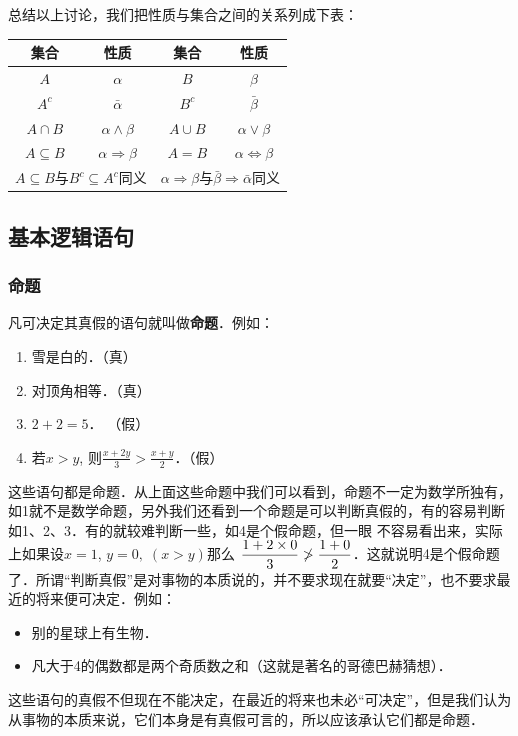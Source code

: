 总结以上讨论，我们把性质与集合之间的关系列成下表：
\begin{center}
	\begin{tabular}{cc|cc}
		\hline
		集合  & 性质 &集合  &性质\\
		\hline
		$A$ & $\alpha$ & $B$ & $\beta$\\
		$A^c$ & $\bar\alpha$ & $B^c$ & $\bar\beta$\\
		$A\cap B$ & $\alpha\wedge \beta$ & $A\cup B$ & $\alpha\vee\beta$\\
		$A\subseteq B$ & $\alpha\Rightarrow\beta $& $A=B$&$\alpha\Leftrightarrow \beta$\\
		\multicolumn{2}{c|}{$A\subseteq B$与$B^c\subseteq A^c$同义}& \multicolumn{2}{|c}{$\alpha\Rightarrow\beta$与$\bar\beta\Rightarrow\bar\alpha$同义}\\
		\hline
	\end{tabular}
\end{center}

\subsection{基本逻辑语句}
\subsubsection{命题}
凡可决定其真假的语句就叫做\textbf{命题}．例如：
\begin{enumerate}
	\item 雪是白的．（真）
	\item 对顶角相等．（真）
	\item $2+2=5$． （假）
	\item 若$x>y$, 则$\frac{x+2y}{3}>\frac{x+y}{2}$．（假）
\end{enumerate}

这些语句都是命题．从上面这些命题中我们可以看到，命题不一定为数学所独有，如1就不是数学命题，另外我们还看到一个命题是可以判断真假的，有的容易判断如1、2、3．有的就较难判断一些，如4是个假命题，但一眼
不容易看出来，实际上如果设$x=1$, $y=0,\;(x>y)$那么
$\dfrac{1+2\times 0}{3}\not>\dfrac{1+0}{2}$．这就说明4是个假命题了．所谓“判断真假”是对事物的本质说的，并不要求现在就要“决定”，也不要求最近的将来便可决定．例如：
\begin{itemize}
	\item 别的星球上有生物．
	\item 凡大于4的偶数都是两个奇质数之和（这就是著名的哥德巴赫猜想）．
\end{itemize}

这些语句的真假不但现在不能决定，在最近的将来也未必“可决定”，但是我们认为从事物的本质来说，它们本身是有真假可言的，所以应该承认它们都是命题．

